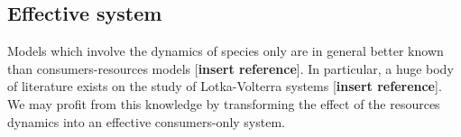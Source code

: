 \documentclass[12pt, titlepage]{report}
\begin{document}
\subsection{Effective system}
Models which involve the dynamics of species only are in general better known than consumers-resources models [\textbf{insert reference}]. In particular, a huge body of literature exists on the study of Lotka-Volterra systems [\textbf{insert reference}]. We may profit from this knowledge by transforming the effect of the resources dynamics into an effective consumers-only system.
\end{document}
